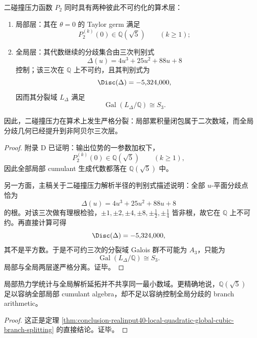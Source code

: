 \begin{theorem}[局部二次数域与全局三次分歧的算术分裂]\label{thm:conclusion-realinput40-local-quadratic-global-cubic-branch-splitting}
二碰撞压力函数 \(P_2\) 同时具有两种彼此不可约化的算术层：
\begin{enumerate}
  \item 局部层：其在 \(\theta=0\) 的 Taylor germ 满足
  \[
  P_2^{(k)}(0)\in \mathbb Q(\sqrt5)
  \qquad (k\ge 1);
  \]
  \item 全局层：其代数继续的分歧集合由三次判别式
  \[
  \Delta(u)=4u^3+25u^2+88u+8
  \]
  控制；该三次在 \(\mathbb Q\) 上不可约，且其判别式为
  \[
  \Disc(\Delta)=-5{,}324{,}000,
  \]
  因而其分裂域 \(L_\Delta\) 满足
  \[
  \operatorname{Gal}(L_\Delta/\mathbb Q)\cong S_3.
  \]
\end{enumerate}
因此，二碰撞压力在算术上发生严格分裂：局部累积量闭包属于二次数域，而全局分歧几何已经提升到非阿贝尔三次层。
\end{theorem}
\begin{proof}
附录 D 已证明：输出位势的一参数加权下，
\[
P_2^{(k)}(0)\in\mathbb Q(\sqrt5)
\qquad (k\ge 1),
\]
因此全部局部 cumulant 生成代数都落在 \(\mathbb Q(\sqrt5)\) 中。

另一方面，主稿关于二碰撞压力解析半径的判别式描述说明：全部 \(u\)-平面分歧点恰为
\[
\Delta(u)=4u^3+25u^2+88u+8
\]
的根。对该三次做有理根检验，\(\pm 1,\pm 2,\pm 4,\pm 8,\pm \frac12,\pm \frac14\) 皆非根，故它在 \(\mathbb Q\) 上不可约。再直接计算可得
\[
\Disc(\Delta)=-5{,}324{,}000,
\]
其不是平方数。于是不可约三次的分裂域 Galois 群不可能为 \(A_3\)，只能为
\[
\operatorname{Gal}(L_\Delta/\mathbb Q)\cong S_3.
\]
局部与全局两层遂严格分离。证毕。
\end{proof}

\begin{corollary}\label{cor:conclusion-realinput40-local-cumulant-field-not-global-branch-field}
局部热力学统计与全局解析延拓并不共享同一最小数域。更精确地说，\(\mathbb Q(\sqrt5)\) 足以容纳全部局部 cumulant algebra，却不足以容纳控制全局分歧的 branch arithmetic。
\end{corollary}
\begin{proof}
这正是定理 \ref{thm:conclusion-realinput40-local-quadratic-global-cubic-branch-splitting} 的直接结论。证毕。
\end{proof}

